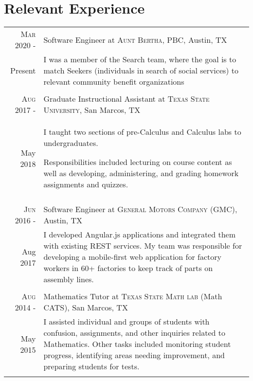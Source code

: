 \documentclass[a4paper,10pt]{article}
\begin{document}
\section{Relevant Experience}
\begin{tabular}{r|p{12cm}}

\textsc{Mar 2020 -} & Software Engineer at \textsc{Aunt Bertha, PBC}, Austin, TX \\
Present & 
	
	\small{
	I was a member of the Search team, where the goal is to match Seekers (individuals in search of social services) to relevant community benefit organizations} \\ 
	
 \multicolumn{2}{c}{} \\

\textsc{Aug 2017 -} & Graduate Instructional Assistant at \textsc{Texas State University}, San Marcos, TX \\
May 2018 & \footnotesize{I taught two sections of pre-Calculus and Calculus labs to undergraduates.
 
 	Responsibilities included lecturing on course content as well as developing, administering, and grading homework assignments and quizzes.} \\
 \multicolumn{2}{c}{} \\
 
 \textsc{Jun 2016 -} & Software Engineer at \textsc{General Motors Company (GMC)}, Austin, TX \\
Aug 2017 & \footnotesize{I developed Angular.js applications and integrated them with existing REST services. My team was responsible for developing a mobile-first web application for factory workers in 60+ factories to keep track of parts on assembly lines.
} \\
 \multicolumn{2}{c}{} \\
 
 \textsc{Aug 2014 -} & Mathematics Tutor at \textsc{Texas State Math lab} (Math CATS), San Marcos, TX \\
 May 2015 & \footnotesize{I assisted individual and groups of students with confusion, assignments, and other inquiries related to Mathematics. Other tasks included monitoring student progress, identifying areas needing improvement, and preparing students for tests.} \\
 \multicolumn{2}{c}{} \\
\end{tabular}
\end{document}
